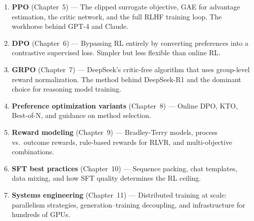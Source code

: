 \begin{enumerate}
  \item \textbf{PPO} (Chapter~5) --- The clipped surrogate objective, GAE for advantage estimation, the critic network, and the full RLHF training loop. The workhorse behind GPT-4 and Claude.
  \item \textbf{DPO} (Chapter~6) --- Bypassing RL entirely by converting preferences into a contrastive supervised loss. Simpler but less flexible than online RL.
  \item \textbf{GRPO} (Chapter~7) --- DeepSeek's critic-free algorithm that uses group-level reward normalization. The method behind DeepSeek-R1 and the dominant choice for reasoning model training.
  \item \textbf{Preference optimization variants} (Chapter~8) --- Online DPO, KTO, Best-of-N, and guidance on method selection.
  \item \textbf{Reward modeling} (Chapter~9) --- Bradley-Terry models, process vs.~outcome rewards, rule-based rewards for RLVR, and multi-objective combinations.
  \item \textbf{SFT best practices} (Chapter~10) --- Sequence packing, chat templates, data mixing, and how SFT quality determines the RL ceiling.
  \item \textbf{Systems engineering} (Chapter~11) --- Distributed training at scale: parallelism strategies, generation--training decoupling, and infrastructure for hundreds of GPUs.
\end{enumerate}

